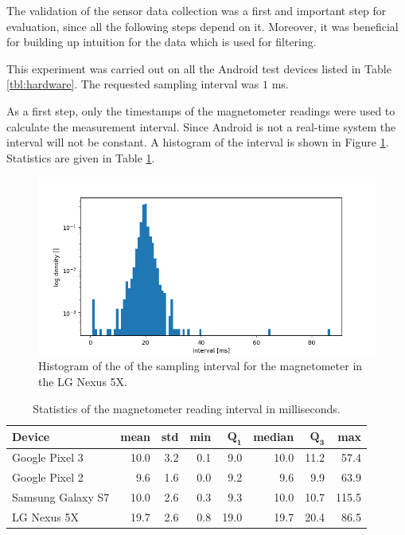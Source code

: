 The validation of the sensor data collection was a first and important step for evaluation, since all the following steps depend on it. Moreover, it was beneficial for building up intuition for the data which is used for filtering.

This experiment was carried out on all the Android test devices listed in Table \ref{tbl:hardware}. The requested sampling interval was $1$ ms.

As a first step, only the timestamps of the magnetometer readings were used to calculate the measurement interval. Since Android is not a real-time system the interval will not be constant. A histogram of the interval is shown in Figure \ref{fig:interval}. Statistics are given in Table \ref{tbl:mag_interval}.

\begin{figure}[hbt!]
    \centering
    \includegraphics[width=1.0\textwidth]{figures/interval_nexus5.png}
    \caption{Histogram of the of the sampling interval for the magnetometer in the LG Nexus 5X.}
    \label{fig:interval}
\end{figure}

\begin{table}[h]
    \centering
    \begin{tabular}{ | l | r | r | r | r | r | r | r | }
    \hline
    \textbf{Device}   & \textbf{mean} & \textbf{std} & \textbf{min} & $\bm{Q_1}$ & \textbf{median} & $\bm{Q_3}$ & \textbf{max} \\ \hline
    Google Pixel 3    & 10.0 & 3.2 & 0.1 &  9.0 & 10.0 & 11.2 &  57.4 \\ \hline
    Google Pixel 2    &  9.6 & 1.6 & 0.0 &  9.2 &  9.6 &  9.9 &  63.9 \\ \hline
    Samsung Galaxy S7 & 10.0 & 2.6 & 0.3 &  9.3 & 10.0 & 10.7 & 115.5 \\ \hline
    LG Nexus 5X       & 19.7 & 2.6 & 0.8 & 19.0 & 19.7 & 20.4 &  86.5 \\ \hline
    \end{tabular}
    \caption{Statistics of the magnetometer reading interval in milliseconds.}
    \label{tbl:mag_interval}
\end{table}

